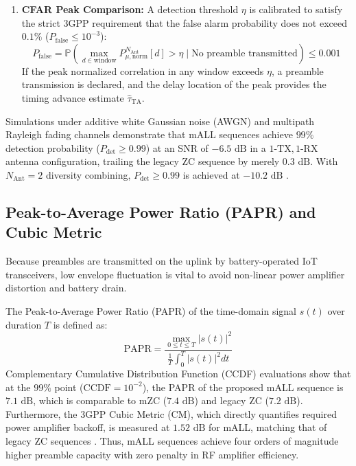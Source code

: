 \begin{enumerate}
\begin{equation}
    \end{equation}
    \item \textbf{CFAR Peak Comparison:} A detection threshold $\eta$ is calibrated to satisfy the strict 3GPP requirement that the false alarm probability does not exceed $0.1\%$ ($P_{\mathrm{false}} \le 10^{-3}$):
    \begin{equation}
        P_{\mathrm{false}} = \mathbb{P}\left( \max_{d \in \mathrm{window}} P_{\mu, \mathrm{norm}}^{N_{\mathrm{Ant}}}[d] > \eta \;\Bigg|\; \text{No preamble transmitted} \right) \le 0.001
    \end{equation}
    If the peak normalized correlation in any window exceeds $\eta$, a preamble transmission is declared, and the delay location of the peak provides the timing advance estimate $\hat{\tau}_{\mathrm{TA}}$.
\end{enumerate}

Simulations under additive white Gaussian noise (AWGN) and multipath Rayleigh fading channels demonstrate that mALL sequences achieve $99\%$ detection probability ($P_{\mathrm{det}} \ge 0.99$) at an SNR of $-6.5\text{~dB}$ in a $1\text{-TX}, 1\text{-RX}$ antenna configuration, trailing the legacy ZC sequence by merely $0.3\text{~dB}$. With $N_{\mathrm{Ant}} = 2$ diversity combining, $P_{\mathrm{det}} \ge 0.99$ is achieved at $-10.2\text{~dB}$ \cite{pawar2023high}.

\subsection{Peak-to-Average Power Ratio (PAPR) and Cubic Metric}
Because preambles are transmitted on the uplink by battery-operated IoT transceivers, low envelope fluctuation is vital to avoid non-linear power amplifier distortion and battery drain. 

The Peak-to-Average Power Ratio (PAPR) of the time-domain signal $s(t)$ over duration $T$ is defined as:
\begin{equation}
    \mathrm{PAPR} = \frac{\max_{0 \le t \le T} |s(t)|^2}{\frac{1}{T} \int_0^T |s(t)|^2 dt}
\end{equation}
Complementary Cumulative Distribution Function (CCDF) evaluations show that at the $99\%$ point ($\mathrm{CCDF} = 10^{-2}$), the PAPR of the proposed mALL sequence is $7.1\text{~dB}$, which is comparable to mZC ($7.4\text{~dB}$) and legacy ZC ($7.2\text{~dB}$). Furthermore, the 3GPP Cubic Metric (CM), which directly quantifies required power amplifier backoff, is measured at $1.52\text{~dB}$ for mALL, matching that of legacy ZC sequences \cite{pawar2023high}. Thus, mALL sequences achieve four orders of magnitude higher preamble capacity with zero penalty in RF amplifier efficiency.

